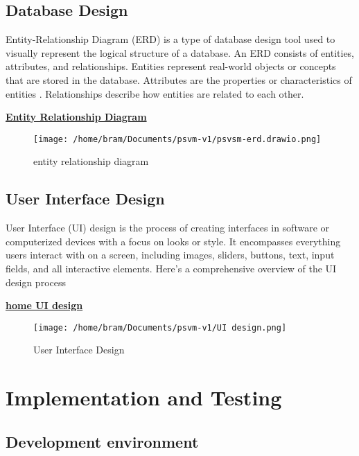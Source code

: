 \documentclass[a4paper, 12pt]{report}
\begin{document}
\section{Database Design}
\noindent Entity-Relationship Diagram (ERD) is a type of database design tool used to visually represent the logical structure of a database.
An ERD consists of entities, attributes, and relationships. Entities represent real-world objects or concepts  that are stored in the database. Attributes are the properties or characteristics of entities . Relationships describe how entities are related to each other.\par
\textbf{\underline{Entity Relationship Diagram}}
\par
\begin{figure}[h] %
  \centering
  \texttt{[image: /home/bram/Documents/psvm-v1/psvsm-erd.drawio.png]} %
  \caption{entity relationship diagram} %
  \label{fig:ERD} %
\end{figure}
\clearpage
\section{User Interface Design}
\noindent User Interface (UI) design is the process of creating interfaces in software or computerized devices with a focus on looks or style. It encompasses everything users interact with on a screen, including images, sliders, buttons, text, input fields, and all interactive elements. Here's a comprehensive overview of the UI design process\par
\textbf{\underline{home UI design}}\par 
\par
\begin{figure}[h] %
  \centering
  \texttt{[image: /home/bram/Documents/psvm-v1/UI design.png]} %
  \caption{User Interface Design} %
  \label{fig:UI design} %
\end{figure}
\chapter{Implementation and Testing}
\section{Development environment}
\end{document}
